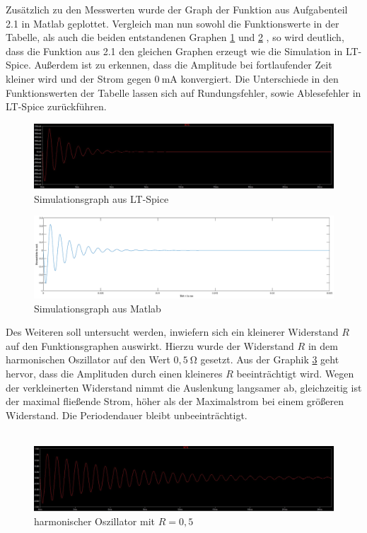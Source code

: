 Zusätzlich zu den Messwerten wurde der Graph der Funktion aus Aufgabenteil 2.1 in Matlab geplottet. Vergleich man nun sowohl die Funktionswerte in der Tabelle, als auch die beiden entstandenen Graphen \ref{lt} und \ref{mat} , so wird deutlich, dass die Funktion aus 2.1 den gleichen Graphen erzeugt wie die Simulation in LT-Spice. Außerdem ist zu erkennen, dass die Amplitude bei fortlaufender Zeit kleiner wird und der Strom gegen $0\:$\si{\milli\ampere} konvergiert. Die Unterschiede in den Funktionswerten der Tabelle lassen sich auf Rundungsfehler, sowie Ablesefehler in LT-Spice zurückführen.
\begin{figure}[h]
	\centering
	\includegraphics[width=\textwidth]{data/ltsim}
	\caption{Simulationsgraph aus LT-Spice}
	\label{lt}
\end{figure}

\begin{figure}[h!]
	\includegraphics[width=\textwidth]{data/fctmat}
	\caption{Simulationsgraph aus Matlab}
	\label{mat}
\end{figure}
\newpage
Des Weiteren soll untersucht werden, inwiefern sich ein kleinerer Widerstand $R$ auf den Funktionsgraphen auswirkt. Hierzu wurde der Widerstand $R$ in dem harmonischen Oszillator auf den Wert $0,5\:$\si{\ohm} gesetzt. Aus der Graphik \ref{14R} geht hervor, dass die Amplituden durch einen kleineres $R$ beeinträchtigt wird. Wegen der verkleinerten Widerstand nimmt die Auslenkung langsamer ab, gleichzeitig ist der maximal fließende Strom,  höher als der Maximalstrom bei einem größeren Widerstand. Die Periodendauer bleibt unbeeinträchtigt.
\\ \\
\begin{figure}[h]
	\includegraphics[width=\textwidth]{data/kleineresR}
	\caption{harmonischer Oszillator mit $R = 0,5\:$\ohm}
	\label{14R}
\end{figure}

